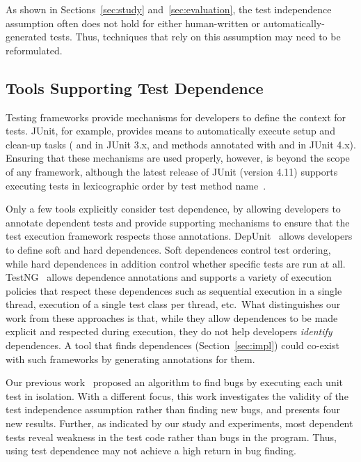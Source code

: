 
As shown in Sections~\ref{sec:study} and~\ref{sec:evaluation},
the test independence assumption often does not hold for either
human-written or automatically-generated tests. Thus, techniques
that rely on this assumption may need to be reformulated.

\subsection{Tools Supporting Test Dependence}
\label{sec:supporting}

Testing frameworks provide mechanisms
for developers to define the context for tests.
JUnit, for example, provides means to
automatically execute setup and clean-up tasks
( and  in JUnit
3.x, and methods annotated with  and  in
JUnit 4.x). Ensuring that these mechanisms are used properly, however, is
beyond the scope of any framework, although the latest release of JUnit
(version 4.11)
supports executing tests in lexicographic order by test method name~\cite{junitordering}.


Only a few tools explicitly consider test dependence, by
allowing developers to annotate dependent tests and
provide supporting mechanisms to ensure that the test execution framework
respects those annotations.  DepUnit~\cite{depunit}
allows developers to define soft and hard dependences. Soft dependences control
test ordering, while hard dependences in addition control whether specific tests are
run at all.  TestNG~\cite{testng} 
allows dependence annotations and supports a variety of execution policies
that respect these dependences
such as sequential execution
in a single thread, execution of a single test class per thread, etc.\
What distinguishes our work from these approaches is that, while they allow dependences
to be made explicit and respected during execution, they do not help developers
\emph{identify} dependences.  A tool that finds dependences
(Section~\ref{sec:impl}) could co-exist
with such frameworks by generating annotations for them.

Our previous work~\cite{DBLP:conf/sigsoft/MusluSW11} proposed
an algorithm to find bugs by executing each unit
test in isolation. With a different focus,
this work investigates the validity of the test independence assumption
rather than finding new bugs,
and presents four new results.
Further, as indicated by our study and experiments, most dependent
tests reveal weakness in the test code rather than bugs in the program. Thus,
using test dependence may not achieve a high return in bug finding.

